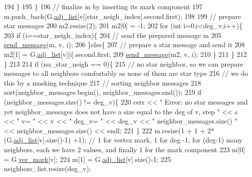\begin{DoxyCode}
194               \}
195             \}
196             \textcolor{comment}{// finalize m by inserting its mark component}
197             m.push\_back(G.\hyperlink{classmarked__graph_a1a0bf7ca413a278763f7c878b3b6fd6f}{adj\_list}[v][star\_neigh\_index].second.first);
198 
199             \textcolor{comment}{// prepare star messages}
200             m2.resize(2);
201             m2[0] = -1;
202             \textcolor{keywordflow}{for} (\textcolor{keywordtype}{int} i=0;i<deg\_v;i++)\{
203               \textcolor{keywordflow}{if} (i==star\_neigh\_index)\{
204                 \textcolor{comment}{// send the prepared message m}
205                 \hyperlink{classgraph__message_aa76d1d5420a12477fa1dddd878d78c8f}{send\_message}(m, v, i);
206               \}\textcolor{keywordflow}{else}\{
207                 \textcolor{comment}{// prepare a star message and send it}
208                 m2[1] = G.\hyperlink{classmarked__graph_a1a0bf7ca413a278763f7c878b3b6fd6f}{adj\_list}[v][i].second.first;
209                 \hyperlink{classgraph__message_aa76d1d5420a12477fa1dddd878d78c8f}{send\_message}(m2, v, i);
210               \}
211             \}
212           \}
213 
214           \textcolor{keywordflow}{if} (nu\_star\_neigh == 0)\{
215             \textcolor{comment}{// no star neighbor, so we can prepare messages to all neighbors comfortably as none of them
       are star type}
216             \textcolor{comment}{// we do this by a masking technique}
217             \textcolor{comment}{// sorting neighbor messages}
218             sort(neighbor\_messages.begin(), neighbor\_messages.end());
219             \textcolor{keywordflow}{if} (neighbor\_messages.size() != deg\_v)\{
220               cerr << \textcolor{stringliteral}{" Error: no star messages and yet neighbor\_messages does not have a size equal to the
       deg of v, step "} << s << \textcolor{stringliteral}{" v= "} << v <<  \textcolor{stringliteral}{" deg\_v= "} << deg\_v << \textcolor{stringliteral}{" neighbor\_messages.size() "} << 
      neighbor\_messages.size() << endl;
221             \}
222             m.resize(1 + 1 + 2*(G.\hyperlink{classmarked__graph_a1a0bf7ca413a278763f7c878b3b6fd6f}{adj\_list}[v].size()-1) +1); \textcolor{comment}{// 1 for vertex mark, 1 for deg -1,
       for (deg-1) many neighbors, each we have 2 values, and finally 1 for the mark component}
223             m[0] = G.\hyperlink{classmarked__graph_ac83e9377dd4d8bb95be1ac949b127296}{ver\_mark}[v];
224             m[1] = G.\hyperlink{classmarked__graph_a1a0bf7ca413a278763f7c878b3b6fd6f}{adj\_list}[v].size()-1;
225             neighbors\_list.resize(deg\_v);

\end{DoxyCode}
